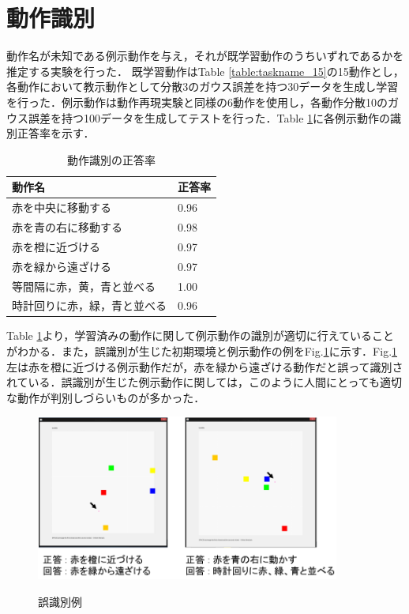 \section{動作識別}

動作名が未知である例示動作を与え，それが既学習動作のうちいずれであるかを推定する実験を行った．
既学習動作はTable \ref{table:taskname_15}の15動作とし，
各動作において教示動作として分散3のガウス誤差を持つ30データを生成し学習を行った．例示動作は動作再現実験と同様の6動作を使用し，各動作分散10のガウス誤差を持つ100データを生成してテストを行った．Table \ref{table:result}に各例示動作の識別正答率を示す．
\begin{table}[h]
	\caption{動作識別の正答率}
	\label{table:result}
	\centering
  	\begin{tabular}{|l|l|} \hline
    	動作名 & 正答率\\ \hline
   	赤を中央に移動する 		& 0.96
    	\\
    	赤を青の右に移動する 		& 0.98
    	\\
    	赤を橙に近づける 			& 0.97
    	\\
    	赤を緑から遠ざける 			& 0.97
    	\\
    	等間隔に赤，黄，青と並べる 	& 1.00
    	\\
    	時計回りに赤，緑，青と並べる 	& 0.96
    	\\ \hline
  	\end{tabular}
\end{table}
Table \ref{table:result}より，学習済みの動作に関して例示動作の識別が適切に行えていることがわかる．また，誤識別が生じた初期環境と例示動作の例をFig.\ref{figure:failure}に示す．Fig.\ref{figure:failure}左は赤を橙に近づける例示動作だが，赤を緑から遠ざける動作だと誤って識別されている．誤識別が生じた例示動作に関しては，このように人間にとっても適切な動作が判別しづらいものが多かった．



	\begin{figure}[h]
		\begin{center}
			\includegraphics[width=10cm]{figure4.png} \\ %
			\caption{誤識別例}
			\label{figure:failure}
		\end{center}
	\end{figure}


